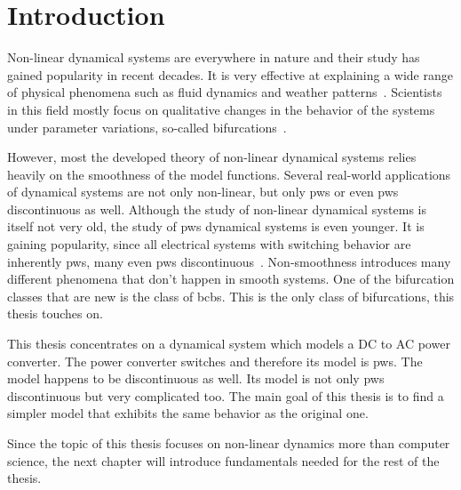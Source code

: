 \chapter{Introduction}
\label{chap:intro}

Non-linear dynamical systems are everywhere in nature and their study has gained popularity in recent decades.
It is very effective at explaining a wide range of physical phenomena such as fluid dynamics and weather patterns~\cite{bernardo2008piecewise}.
Scientists in this field mostly focus on qualitative changes in the behavior of the systems under parameter variations, so-called bifurcations~\cite{simpson2010}.

However, most the developed theory of non-linear dynamical systems relies heavily on the smoothness of the model functions.
Several real-world applications of dynamical systems are not only non-linear, but only \gls{pws} or even \gls{pws} discontinuous as well.
Although the study of non-linear dynamical systems is itself not very old, the study of \gls{pws} dynamical systems is even younger.
It is gaining popularity, since all electrical systems with switching behavior are inherently \gls{pws}, many even \gls{pws} discontinuous~\cite{simpson2010}.
Non-smoothness introduces many different phenomena that don't happen in smooth systems.
One of the bifurcation classes that are new is the class of \glspl{bcb}.
This is the only class of bifurcations, this thesis touches on.

This thesis concentrates on a dynamical system which models a DC to AC power converter.
The power converter switches and therefore its model is \gls{pws}.
The model happens to be discontinuous as well.
Its model is not only \gls{pws} discontinuous but very complicated too.
The main goal of this thesis is to find a simpler model that exhibits the same behavior as the original one.

Since the topic of this thesis focuses on non-linear dynamics more than computer science, the next chapter will introduce fundamentals needed for the rest of the thesis.
